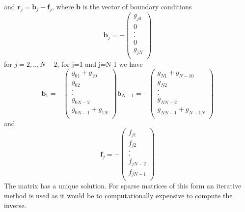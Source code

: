 and $\mathbf{r}_j=\mathbf{b}_j-\mathbf{f}_j$, where $\mathbf{b}$ is the vector of 
boundary conditions 
\[\mathbf{b}_j =-\left(\begin{array}{c}
g_{j0}\\
0\\
.\\
.\\
0\\
g_{jN}\\
\end{array}\right)
\]
for $j=2,..,N-2$, for j=1 and j=N-1 we have
\[
\mathbf{b}_1 =-\left(\begin{array}{c}
g_{01}+g_{10}\\
g_{02}\\
.\\
.\\
g_{0N-2}\\
g_{0N-1}+g_{1N}\\
\end{array}\right)
\mathbf{b}_{N-1} =-\left(\begin{array}{c}
g_{N1}+g_{N-10}\\
g_{N2}\\
.\\
.\\
g_{NN-2}\\
g_{NN-1}+g_{N-1N}\\
\end{array}\right)
\]
and 
\[\mathbf{f}_j =-\left(\begin{array}{c}
f_{j1}\\
f_{j2}\\
.\\
.\\
f_{jN-2}\\
f_{jN-1}\\
\end{array}\right)
\]
The matrix has a unique solution. For sparse matrices of this form an iterative method is used as it would be to computationally expensive to compute the inverse.
